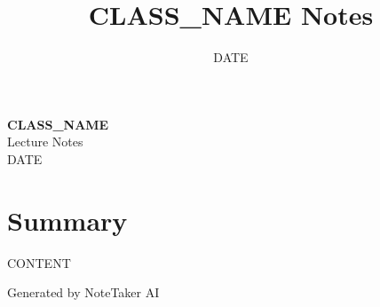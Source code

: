\documentclass[11pt,a4paper]{article}
\title{\textcolor{primarycolor}{\Huge\textbf{CLASS_NAME Notes}}}
\author{}
\date{\textcolor{secondarycolor}{DATE}}
\begin{document}
\begin{center}
    \colorbox{secondarycolor!10}{%
        \parbox{0.95\textwidth}{%
            \centering
            \vspace{0.5cm}
            {\Huge\textcolor{primarycolor}{\textbf{CLASS_NAME}}} \\[0.5cm]
            {\Large Lecture Notes} \\[0.3cm]
            {\large\textcolor{secondarycolor}{DATE}}
            \vspace{0.5cm}
        }
    }
\end{center}

\vspace{1cm}

\section*{\textcolor{primarycolor}{Summary}}
CONTENT

\vspace{1cm}

\begin{center}
\textcolor{secondarycolor}{\small Generated by NoteTaker AI}
\end{center}
\end{document}
